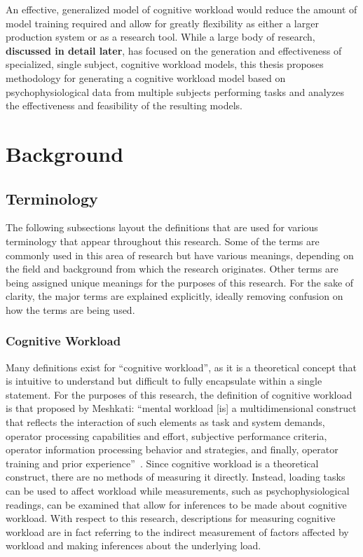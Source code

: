 \documentclass[11pt]{article}
\begin{document}
An effective, generalized model of cognitive workload would reduce the amount of model training required and allow for greatly flexibility as either a larger production system or as a research tool. While a large body of research, {\bf discussed in detail later}, has focused on the generation and effectiveness of specialized, single subject, cognitive workload models, this thesis proposes methodology for generating a cognitive workload model based on psychophysiological data from multiple subjects performing tasks and analyzes the effectiveness and feasibility of the resulting models.

\section{Background}
	\subsection{Terminology}
	The following subsections layout the definitions that are used for various terminology that appear throughout this research. Some of the terms are commonly used in this area of research but have various meanings, depending on the field and background from which the research originates. Other terms are being assigned unique meanings for the purposes of this research. For the sake of clarity, the major terms are explained explicitly, ideally removing confusion on how the terms are being used.
	
		\subsubsection{Cognitive Workload}
		Many definitions exist for ``cognitive workload'', as it is a theoretical concept that is intuitive to understand but difficult to fully encapsulate within a single statement. For the purposes of this research, the definition of cognitive workload is that proposed by Meshkati: ``mental workload [is] a multidimensional construct that reflects the interaction of such elements as task and system demands, operator processing capabilities and effort, subjective performance criteria, operator information processing behavior and strategies, and finally, operator training and prior experience''~\cite{Meshkati}. Since cognitive workload is a theoretical construct, there are no methods of measuring it directly. Instead, loading tasks can be used to affect workload while measurements, such as psychophysiological readings, can be examined that allow for inferences to be made about cognitive workload.  With respect to this research, descriptions for measuring cognitive workload are in fact referring to the indirect measurement of factors affected by workload and making inferences about the underlying load. 
		
\end{document}
